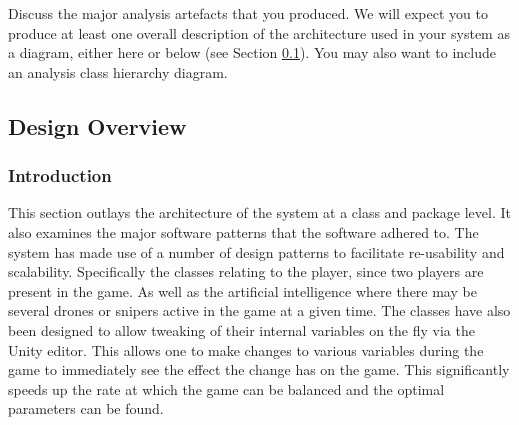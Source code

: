 \documentclass[11pt,a4paper]{article}
\begin{document}
Discuss the major analysis artefacts that you produced. We will expect
you to produce at least one overall description of the architecture
used in your system as a diagram, either here or below (see Section
\ref{ss:design-overview}). You may also want to include an analysis
class hierarchy diagram.

\subsection{Design Overview}
\label{ss:design-overview}
\subsubsection{Introduction}
This section outlays the architecture of the system at a class and package level. It also examines the major software patterns that the software adhered to. The system has made use of a number of design patterns to facilitate re-usability and scalability. Specifically the classes relating to the player, since two players are present in the game. As well as the artificial intelligence where there may be several drones or snipers active in the game at a given time. The classes have also been designed to allow tweaking of their internal variables on the fly via the Unity editor. This allows one to make changes to various variables during the game to immediately see the effect the change has on the game. This significantly speeds up the rate at which the game can be balanced and the optimal parameters can be found.
\end{document}
